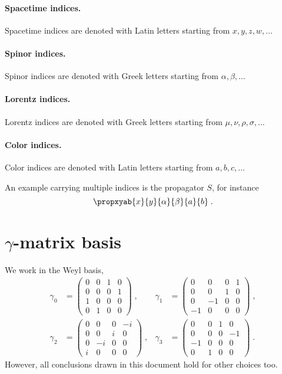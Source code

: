 \paragraph{Spacetime indices.}
Spacetime indices are denoted with Latin letters starting from $x, y, z, w, \ldots$

\paragraph{Spinor indices.}
Spinor indices are denoted with Greek letters starting from $\alpha, \beta, \ldots$

\paragraph{Lorentz indices.}
Lorentz indices are denoted with Greek letters starting from $\mu, \nu, \rho, \sigma, \ldots$

\paragraph{Color indices.}
Color indices are denoted with Latin letters starting from $a, b, c, \ldots$

An example carrying multiple indices is the propagator $S$, for instance
\begin{equation}
\propxyab{x}{y}{\alpha}{\beta}{a}{b} \;.
\end{equation}


\section{\texorpdfstring{$\gamma$}{Gamma}-matrix basis}

We work in the Weyl basis,
\begin{align} \label{eq:gamma:weyl:basis}
\gamma_0 &=
\begin{pmatrix}
0 & 0 & 1 & 0 \\
0 & 0 & 0 & 1 \\
1 & 0 & 0 & 0 \\
0 & 1 & 0 & 0
\end{pmatrix} \;,
&
\gamma_1 &=
\begin{pmatrix}
0 & 0 & 0 & 1 \\
0 & 0 & 1 & 0 \\
0 & -1 & 0 & 0 \\
-1 & 0 & 0 & 0
\end{pmatrix} \;, \\
\gamma_2 &=
\begin{pmatrix}
0 & 0 & 0 & -i \\
0 & 0 & i & 0 \\
0 & -i & 0 & 0 \\
i & 0 & 0 & 0
\end{pmatrix} \;,
&
\gamma_3 &=
\begin{pmatrix}
0 & 0 & 1 & 0 \\
0 & 0 & 0 & -1 \\
-1 & 0 & 0 & 0 \\
0 & 1 & 0 & 0
\end{pmatrix} \;.
\end{align}
However, all conclusions drawn in this document hold for other choices too.

